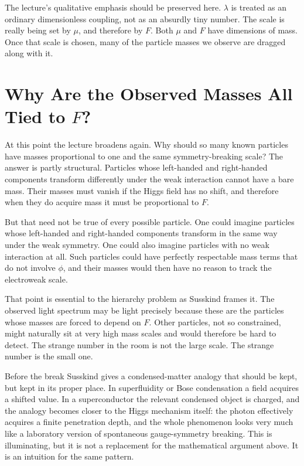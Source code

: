 The lecture's qualitative emphasis should be preserved here. \(\lambda\) is treated as an ordinary dimensionless coupling, not as an absurdly tiny number. The scale is really being set by \(\mu\), and therefore by \(F\). Both \(\mu\) and \(F\) have dimensions of mass. Once that scale is chosen, many of the particle masses we observe are dragged along with it.

\section{Why Are the Observed Masses All Tied to \(F\)?}

At this point the lecture broadens again. Why should so many known particles have masses proportional to one and the same symmetry-breaking scale? The answer is partly structural. Particles whose left-handed and right-handed components transform differently under the weak interaction cannot have a bare mass. Their masses must vanish if the Higgs field has no shift, and therefore when they do acquire mass it must be proportional to \(F\).

But that need not be true of every possible particle. One could imagine particles whose left-handed and right-handed components transform in the same way under the weak symmetry. One could also imagine particles with no weak interaction at all. Such particles could have perfectly respectable mass terms that do not involve \(\phi\), and their masses would then have no reason to track the electroweak scale.

That point is essential to the hierarchy problem as Susskind frames it. The observed light spectrum may be light precisely because these are the particles whose masses are forced to depend on \(F\). Other particles, not so constrained, might naturally sit at very high mass scales and would therefore be hard to detect. The strange number in the room is not the large scale. The strange number is the small one.

Before the break Susskind gives a condensed-matter analogy that should be kept, but kept in its proper place. In superfluidity or Bose condensation a field acquires a shifted value. In a superconductor the relevant condensed object is charged, and the analogy becomes closer to the Higgs mechanism itself: the photon effectively acquires a finite penetration depth, and the whole phenomenon looks very much like a laboratory version of spontaneous gauge-symmetry breaking. This is illuminating, but it is not a replacement for the mathematical argument above. It is an intuition for the same pattern.

